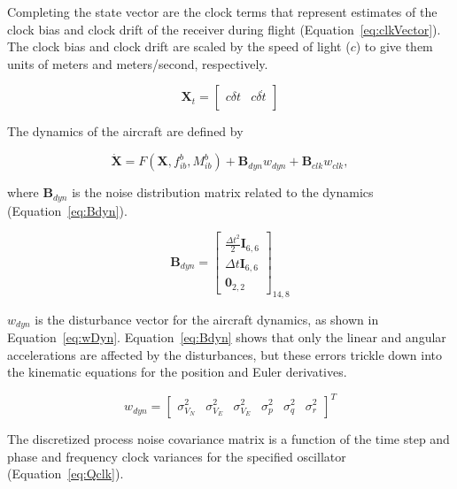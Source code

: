 Completing the state vector are the clock terms that represent estimates of the clock bias and clock drift of the receiver during flight (Equation~\ref{eq:clkVector}). The clock bias and clock drift are scaled by the speed of light (\(c\)) to give them units of meters and meters/second, respectively.

\begin{equation}\label{eq:clkVector}
    \mathbf{X}_t = \begin{bmatrix}
        c\delta t & c\delta\dot{t} \\
    \end{bmatrix}
\end{equation}

The dynamics of the aircraft are defined by

\begin{equation}\label{eq:eulerIntegration}
    \dot{\mathbf{X}} = F\left(\mathbf{X},f_{ib}^b,M_{ib}^b\right) + \mathbf{B}_{dyn}w_{dyn} + \mathbf{B}_{clk}w_{clk},
\end{equation}

where \(\mathbf{B}_{dyn}\) is the noise distribution matrix related to the dynamics (Equation~\ref{eq:Bdyn}).

\begin{equation}\label{eq:Bdyn}
    \mathbf{B}_{dyn} =
    \begin{bmatrix}
        \frac{\Delta t^2}{2}\mathbf{I}_{6,6} \\
        \Delta t\mathbf{I}_{6,6}             \\
        \mathbf{0}_{2,2}
    \end{bmatrix}_{14,8}
\end{equation}

\(w_{dyn}\) is the disturbance vector for the aircraft dynamics, as shown in Equation~\ref{eq:wDyn}. Equation~\ref{eq:Bdyn} shows that only the linear and angular accelerations are affected by the disturbances, but these errors trickle down into the kinematic equations for the position and Euler derivatives.

\begin{equation}\label{eq:wDyn}
    w_{dyn} = \begin{bmatrix}
        \sigma^2_{V_N} & \sigma^2_{V_E} & \sigma^2_{V_E} & \sigma^2_{p} & \sigma^2_{q} & \sigma^2_{r}
    \end{bmatrix}^T
\end{equation}

The discretized process noise covariance matrix is a function of the time step and phase and frequency clock variances for the specified oscillator (Equation~\ref{eq:Qclk}).


